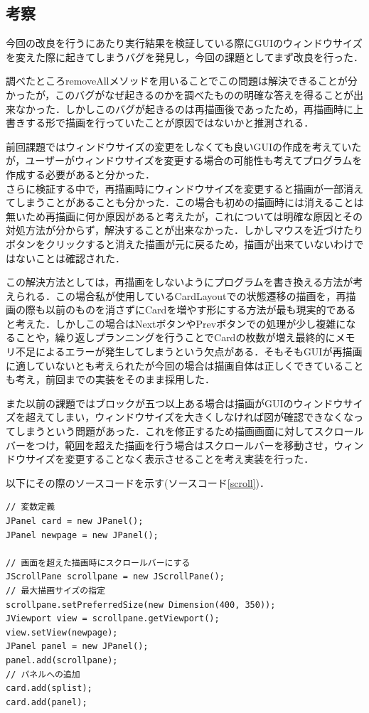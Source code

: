 \documentclass[12pt]{jarticle}
\begin{document}
\clearpage
\subsection{考察}
今回の改良を行うにあたり実行結果を検証している際にGUIのウィンドウサイズを変えた際に起きてしまうバグを発見し，今回の課題としてまず改良を行った．\par
調べたところremoveAllメソッドを用いることでこの問題は解決できることが分かったが，このバグがなぜ起きるのかを調べたものの明確な答えを得ることが出来なかった．しかしこのバグが起きるのは再描画後であったため，再描画時に上書きする形で描画を行っていたことが原因ではないかと推測される．\par
前回課題ではウィンドウサイズの変更をしなくても良いGUIの作成を考えていたが，ユーザーがウィンドウサイズを変更する場合の可能性も考えてプログラムを作成する必要があると分かった．\\

さらに検証する中で，再描画時にウィンドウサイズを変更すると描画が一部消えてしまうことがあることも分かった．この場合も初めの描画時には消えることは無いため再描画に何か原因があると考えたが，これについては明確な原因とその対処方法が分からず，解決することが出来なかった．しかしマウスを近づけたりボタンをクリックすると消えた描画が元に戻るため，描画が出来ていないわけではないことは確認された．\par
この解決方法としては，再描画をしないようにプログラムを書き換える方法が考えられる．この場合私が使用しているCardLayoutでの状態遷移の描画を，再描画の際も以前のものを消さずにCardを増やす形にする方法が最も現実的であると考えた．しかしこの場合はNextボタンやPrevボタンでの処理が少し複雑になることや，繰り返しプランニングを行うことでCardの枚数が増え最終的にメモリ不足によるエラーが発生してしまうという欠点がある．そもそもGUIが再描画に適していないとも考えられたが今回の場合は描画自体は正しくできていることも考え，前回までの実装をそのまま採用した．\\

\clearpage

また以前の課題ではブロックが五つ以上ある場合は描画がGUIのウィンドウサイズを超えてしまい，ウィンドウサイズを大きくしなければ図が確認できなくなってしまうという問題があった．これを修正するため描画画面に対してスクロールバーをつけ，範囲を超えた描画を行う場合はスクロールバーを移動させ，ウィンドウサイズを変更することなく表示させることを考え実装を行った．\\

\vspace{10mm}

以下にその際のソースコードを示す(ソースコード\ref{scroll})．
\begin{lstlisting}[caption=スクロールバーの追加,label=scroll]
// 変数定義
JPanel card = new JPanel();
JPanel newpage = new JPanel();

// 画面を超えた描画時にスクロールバーにする
JScrollPane scrollpane = new JScrollPane();
// 最大描画サイズの指定
scrollpane.setPreferredSize(new Dimension(400, 350));
JViewport view = scrollpane.getViewport();
view.setView(newpage);
JPanel panel = new JPanel();
panel.add(scrollpane);
// パネルへの追加
card.add(splist);
card.add(panel);
\end{lstlisting}
\end{document}
